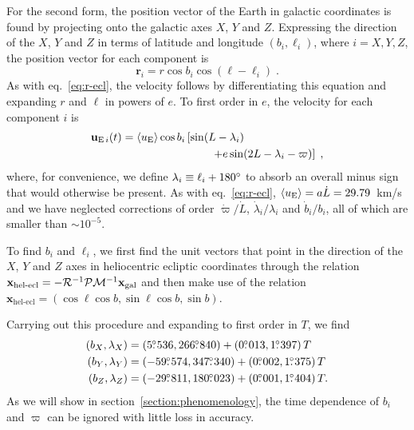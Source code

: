 \documentclass[preprintnumbers,a4paper,twocolumn,floats,nofootinbib,superscriptaddress,aps,prd]{revtex4-1}
\newcommand\fdg{\hbox{$.\!\!^\circ$}}
\begin{document}
For the second form, the position vector of the Earth in galactic coordinates is found by projecting onto the galactic axes $X$, $Y$ and $Z$. Expressing the direction of the $X$, $Y$ and $Z$ in terms of latitude and longitude $(b_i,\ell_i)$, where $i=X,Y,Z$, the position vector for each component is 
\begin{equation}
\label{eq:r-gal}
\mathbf{r}_i=r \cos b_i \cos(\ell-\ell_i)\;.
\end{equation}
As with eq.~\eqref{eq:r-ecl}, the velocity follows by differentiating this equation and expanding $r$ and $\ell$ in powers of $e$. To first order in $e$, the velocity for each component $i$ is
\begin{equation}
\label{eq:uex2}
\begin{split}
\mathbf{u}_{\mathrm{E}\,i}(t)&=\langle u_{\rm{E}}\rangle\cos b_i\left[ \sin(L-\lambda_i)\right.\\
&\qquad\qquad\qquad\qquad\left.+e \sin(2 L-\lambda_i-\varpi)  \right]\;,
\end{split}
\end{equation}
where, for convenience, we define $\lambda_i\equiv\ell_i+180\degree$ to absorb an overall minus sign that would otherwise be present. As with eq.~\eqref{eq:r-ecl}, $\langle u_{\rm{E}}\rangle=a\dot{L}=29.79$~km/s and we have neglected corrections of order $\dot{\varpi}/\dot{L}$, $\dot{\lambda}_i/\lambda_i$ and $\dot{b}_i/b_i$, all of which are smaller than $\sim10^{-5}$.

To find $b_i$ and $\ell_i$, we first find the unit vectors that point in the direction of the $X$, $Y$ and $Z$ axes in heliocentric ecliptic coordinates through the relation $\mathbf{x}_{\text{hel-ecl}}=-\mathcal{R}^{-1}\mathcal{P}\mathcal{M}^{-1}\mathbf{x}_{\rm{gal}}$ and then make use of the relation $\mathbf{x}_{\text{hel-ecl}}=(\cos \ell \cos b, \sin \ell \cos b, \sin b)$.

Carrying out this procedure and expanding to first order in $T$, we find
\begin{align}
(b_X,\lambda_X)&=(5\fdg536, 266\fdg840) + (0\fdg013,1\fdg397)\,T\\
(b_Y,\lambda_Y)&=(-59\fdg574,347\fdg340) + (0\fdg002 ,1\fdg375 )\,T\\
(b_Z,\lambda_Z)&=(-29\fdg811,180\fdg023) + (0\fdg001,1\fdg404)\,T.
\end{align}
As we will show in section~\ref{section:phenomenology}, the time dependence of $b_i$ and $\varpi$ can be ignored with little loss in accuracy.

\end{document}
